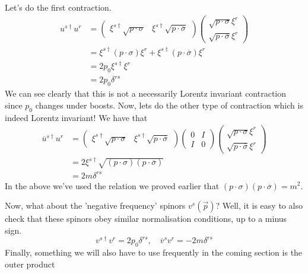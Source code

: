 Let's do the first contraction. 
\begin{align*}
	u^{ s \dagger } u ^ r &=  \begin{pmatrix}  \xi^{ s \dagger } \sqrt{ p \cdot  \sigma } & \xi ^{ s \dagger } \sqrt{ p \cdot  \overline{ \sigma } }   \end{pmatrix} 
	\begin{pmatrix}   \sqrt{ p \cdot  \sigma }  \xi ^{ r  } \\
	\sqrt{ p \cdot  \overline{ \sigma } }  \xi ^{ r } \end{pmatrix} \\
	&=  \xi ^{ s \dagger } ( p \cdot  \sigma ) \xi ^{ r } 
	+ \xi ^{ s \dagger } ( p \cdot  \overline{ \sigma } ) \xi ^{ r } \\
	&=  2p_0 \xi ^{ s \dagger } \xi ^ r  \\ 
	&=  2 p_0 \delta ^{ rs  } 
\end{align*}
We can see clearly that this is 
not a necessarily Lorentz invariant 
contraction since $ p_0 $ changes under boosts. 
Now, lets do the other type of contraction which 
is indeed Lorentz invariant! We have that 
\begin{align*}
	\overline{u }^{ s \dagger } u^ r &= \begin{pmatrix}  
		\xi ^{ s \dagger } \sqrt{ p \cdot  \sigma }  & 
\xi ^{ s \dagger } \sqrt{ p \cdot  \overline{ \sigma } }  \end{pmatrix} 
\begin{pmatrix}  0 & I \\ I & 0  \end{pmatrix}  \begin{pmatrix} 
\sqrt{ p \cdot  \sigma }  \xi ^ r \\ \sqrt{ p \cdot  \overline{ \sigma } }  \xi ^ r 
\end{pmatrix} \\
		   &=  2 \xi ^{ s \dagger }  \sqrt{ ( p \cdot  \sigma   ) 
		   ( p \cdot  \overline{ \sigma   } ) }   \\
		   &=  2m \delta ^{ r s }  
\end{align*}
In the above we've used the relation we proved 
earlier that $ ( p \cdot  \sigma ) ( p \cdot  \overline{ \sigma } )  = m ^ 2 $. 

Now, what about the 'negative frequency' spinors 
$ v ^ s ( \vec{p} ) $? 
Well, it is easy to also check that these spinors
obey similar normalisation conditions, up to 
a minus sign. 
\[
 v ^{ s \dagger} v ^ r = 2 p_0 \delta ^{ rs } , 
 \quad \overline{ v }^{ s } v ^{ r }  =  - 2m \delta ^{ rs }
\] 
Finally, something we will also have to use 
frequently in the coming section is 
the outer product 

